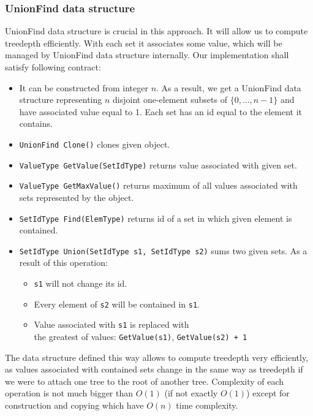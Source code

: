 \subsubsection{UnionFind data structure}
UnionFind data structure is crucial in this approach. It will allow us to compute treedepth efficiently. With each set it associates some value, which will be managed by UnionFind data structure internally. Our implementation shall satisfy following contract:
\begin{itemize}
	\item It can be constructed from integer $n$. As a result, we get a UnionFind data structure representing $n$ disjoint one-element subsets of $\{0,...,n-1\}$ and have associated value equal to 1. Each set has an id equal to the element it contains.
	\item \texttt{UnionFind Clone()} clones given object.
	\item \texttt{ValueType GetValue(SetIdType)} returns value associated with given set.
	\item \texttt{ValueType GetMaxValue()} returns maximum of all values associated with sets represented by the object.
	\item \texttt{SetIdType Find(ElemType)} returns id of a set in which given element is contained.
	\item \texttt{SetIdType Union(SetIdType s1, SetIdType s2)} sums two given sets. As a result of this operation:
	\begin{itemize}
		\item \texttt{s1} will not change its id.
		\item Every element of \texttt{s2} will be contained in \texttt{s1}.
		\item Value associated with \texttt{s1} is replaced with \\ the greatest of values: \texttt{GetValue(s1)}, \texttt{GetValue(s2) + 1}
	\end{itemize}
\end{itemize}
The data structure defined this way allows to compute treedepth very efficiently, as values associated with contained sets change in the same way as treedepth if we were to attach one tree to the root of another tree. Complexity of each operation is not much bigger than $O(1)$ (if not exactly $O(1)$) except for construction and copying which have $O(n)$ time complexity.
